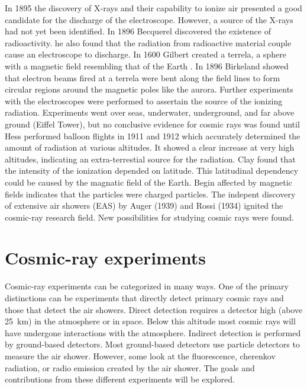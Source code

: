 In 1895 the discovery of X-rays and their capability to ionize air \cite{roentgen1895radiation,flakus1981radiation} presented a good candidate for the discharge of the electroscope. However, a source of the X-rays had not yet been identified. In 1896 Becquerel discovered the existence of radioactivity. he also found that the radiation from radioactive material couple cause an electroscope to discharge. In 1600 Gilbert created a terrela, a sphere with a magnetic field resembling that of the Earth \cite{gilbert1893terrela}. In 1896 Birkeland \cite{birkeland1896aurora} showed that electron beams fired at a terrela were bent along the field lines to form circular regions around the magnetic poles like the aurora. Further experiments with the electroscopes were performed to assertain the source of the ionizing radiation. Experiments went over seas, underwater, underground, and far above ground (Eiffel Tower), but no conclusive evidence for cosmic rays was found until Hess performed balloon flights in 1911 and 1912 which accurately determined the amount of radiation at various altitudes. It showed a clear increase at very high altitudes, indicating an extra-terrestial source for the radiation. Clay found that the intensity of the ionization depended on latitude. This latitudinal dependency could be caused by the magnatic field of the Earth. Begin affected by magnetic fields indicates that the particles were charged particles. The indepent discovery of extensive air showers (EAS) by Auger (1939) \cite{auger1939eas} and Rossi (1934) ignited the cosmic-ray research field. New possibilities for studying cosmic rays were found.


\section{Cosmic-ray experiments}

Cosmic-ray experiments can be categorized in many ways. One of the primary distinctions can be experiments that directly detect primary cosmic rays and those that detect the air showers. Direct detection requires a detector high (above \SI{25}{\kilo\meter}) in the atmosphere or in space. Below this altitude most cosmic rays will have undergone interactions with the atmosphere. Indirect detection is performed by ground-based detectors. Most ground-based detectors use particle detectors to measure the air shower. However, some look at the fluorescence, cherenkov radiation, or radio emission created by the air shower. The goals and contributions from these different experiments will be explored.


